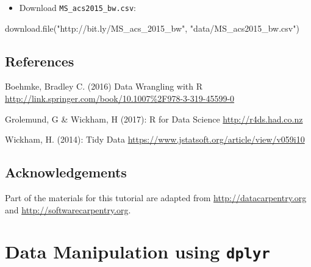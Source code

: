 \documentclass[
]{book}
\newenvironment{Shaded}{\begin{snugshade}}{\end{snugshade}}
\newcommand{\FunctionTok}[1]{\textcolor[rgb]{0.00,0.00,0.00}{#1}}
\newcommand{\NormalTok}[1]{#1}
\newcommand{\StringTok}[1]{\textcolor[rgb]{0.31,0.60,0.02}{#1}}
\providecommand{\tightlist}{%
  \setlength{\itemsep}{0pt}\setlength{\parskip}{0pt}}
\begin{document}
\begin{itemize}
\tightlist
\item
  Download \texttt{MS\_acs2015\_bw.csv}:
\end{itemize}

\begin{Shaded}
\begin{Highlighting}[]
\FunctionTok{download.file}\NormalTok{(}\StringTok{"http://bit.ly/MS\_acs\_2015\_bw"}\NormalTok{,}
              \StringTok{"data/MS\_acs2015\_bw.csv"}\NormalTok{)}
\end{Highlighting}
\end{Shaded}

\hypertarget{references}{%
\section*{References}\label{references}}

Boehmke, Bradley C. (2016) Data Wrangling with R
\url{http://link.springer.com/book/10.1007\%2F978-3-319-45599-0}

Grolemund, G \& Wickham, H (2017): R for Data Science \url{http://r4ds.had.co.nz}

Wickham, H. (2014): Tidy Data \url{https://www.jstatsoft.org/article/view/v059i10}

\hypertarget{acknowledgements}{%
\section*{Acknowledgements}\label{acknowledgements}}

Part of the materials for this tutorial are adapted from \url{http://datacarpentry.org} and \url{http://softwarecarpentry.org}.

\hypertarget{dplyr}{%
\chapter{\texorpdfstring{Data Manipulation using \textbf{\texttt{dplyr}}}{Data Manipulation using dplyr}}\label{dplyr}}
\end{document}
